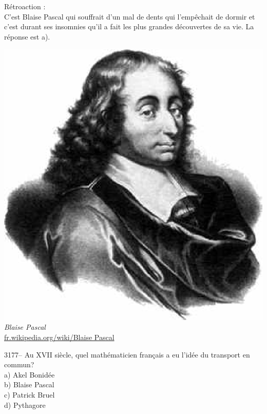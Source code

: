 \documentclass[letterpaper, 12pt]{article}
\begin{document}
R\'etroaction :\\
C'est Blaise Pascal qui souffrait d'un mal de dents qui l'emp\^echait de dormir et c'est durant ses insomnies qu'il a fait les plus grandes d\'ecouvertes de sa vie. La r\'eponse est a).
\begin{center}
\includegraphics[scale=0.3]{Blaise_pascal.eps}\\
\emph{{\small Blaise Pascal}}\\
\href{http://fr.wikipedia.org/wiki/Blaise_Pascal}{fr.wikipedia.org/wiki/Blaise Pascal}\\[5mm]
\end{center}



3177-- Au {\scriptsize XVII\ieme} si\`ecle, quel math\'ematicien fran\c cais a eu l'id\'ee du transport en commun?\\

a) Akel Bonid\'ee\\
b) Blaise Pascal\\
c) Patrick Bruel\\
d) Pythagore\\
\end{document}
